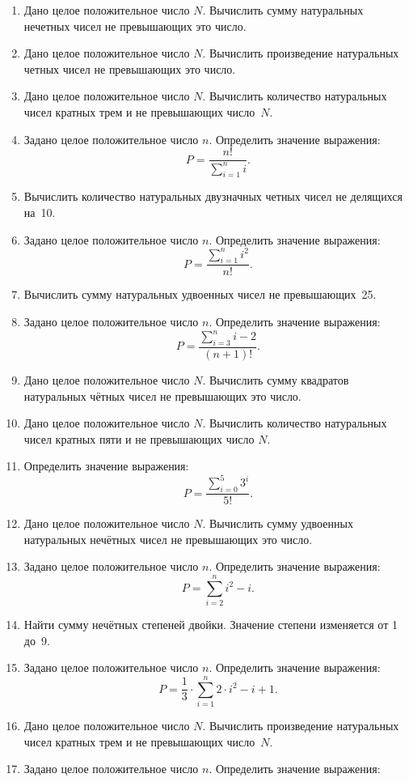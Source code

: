 \begin{enumerate}
\item Дано целое положительное число $N$. Вычислить сумму натуральных нечетных чисел не превышающих
это число.
\item Дано целое положительное число $N$. Вычислить произведение натуральных четных чисел не
превышающих это число.
\item Дано целое положительное число $N$. Вычислить количество натуральных чисел кратных трем и не
превышающих число~$N$.
\item Задано целое положительное число $n$. Определить значение выражения:
 $$\displaystyle P=\frac{n!}{\sum\limits_{i=1}^{n}i}.$$
\item Вычислить количество натуральных двузначных четных чисел не делящихся на~10.
\item Задано целое положительное число $n$. Определить значение выражения:
 $$\displaystyle P=\frac{\sum\limits_{i=1}^{n}i^2}{n!}.$$
\item Вычислить сумму натуральных удвоенных чисел не превышающих~25.
\item Задано целое положительное число $n$. Определить значение выражения:
$$P=\frac{\sum\limits_{i=3}^{n}i-2}{(n+1)!}.$$
\item Дано целое положительное число $N$. Вычислить сумму квадратов натуральных чётных чисел не
превышающих это число.
\item Дано целое положительное число $N$. Вычислить количество натуральных чисел кратных пяти и не
превышающих число $N$.
\item Определить значение выражения:
 $$P=\frac{\sum\limits_{i=0}^{5}3^{i}}{5!}.$$
\item Дано целое положительное число $N$. Вычислить сумму удвоенных натуральных нечётных чисел не
превышающих это число.
\item Задано целое положительное число $n$. Определить значение выражения:
 $$P=\sum\limits_{i=2}^{n}i^{2}-i.$$
\item Найти сумму нечётных степеней двойки. Значение степени изменяется от 1 до~9.
\item Задано целое положительное число $n$. Определить значение выражения:
 $$P=\frac{1}{3}\cdot {\sum\limits_{i=1}^{n}2\cdot i^{2}-i+1}.$$
\item Дано целое положительное число $N$. Вычислить произведение натуральных чисел кратных трем и не
превышающих число~$N$.
\item Задано целое положительное число $n$. Определить значение выражения:

\end{enumerate}
